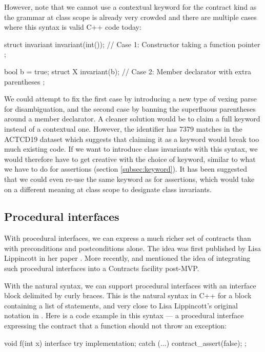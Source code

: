 However, note that we cannot use a contextual keyword for the contract kind  as the grammar at class scope is already very crowded and there are multiple cases where this syntax is valid C++ code today:

\begin{codeblock}
struct invariant {
  invariant(int());   // Case 1: Constructor taking a function pointer
};

bool b = true;
struct X {
  invariant(b);   // Case 2: Member declarator with extra parentheses
};
\end{codeblock}

We could attempt to fix the first case by introducing a new type of vexing parse for disambiguation, and the second case by banning the superfluous parentheses around a member declarator. A cleaner solution would be to claim a full keyword instead of a contextual one. However, the identifier  has 7379 matches in the ACTCD19 dataset which suggests that claiming it as a keyword would break too much existing code. If we want to introduce class invariants with this syntax, we would therefore have to get creative with the choice of keyword, similar to what we have to do for assertions (section \ref{subsec:keyword}). It has been suggested that we could even re-use the same keyword as for assertions, which would take on a different meaning at class scope to designate class invariants.

\subsection{Procedural interfaces}
\label{subsec:interfaces}

With procedural interfaces, we can express a much richer set of contracts than with preconditions and postconditions alone. The idea was first published by Lisa Lippincott in her paper \cite{P0465R0}. More recently, \cite{P2885R3} and \cite{P2935R3} mentioned the idea of integrating such procedural interfaces into a Contracts facility post-MVP.

With the natural syntax, we can support procedural interfaces with an interface block delimited by curly braces. This is the natural syntax in C++ for a block containing a list of statements, and very close to Lisa Lippincott's original notation in \cite{P0465R0}. Here is a code example in this syntax --- a procedural interface expressing the contract that a function should not throw an exception:

\begin{codeblock}
void f(int x)
interface {
  try {
    implementation;
  } 
  catch (...) {
    contract_assert(false);
  }
};
\end{codeblock}

